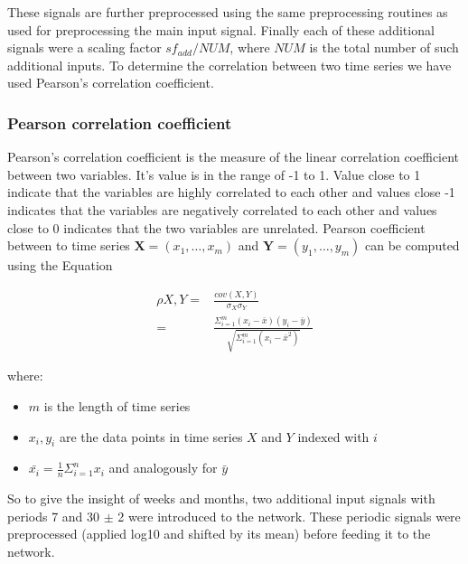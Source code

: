 \begin{enumerate}
\begin{center}
\begin{tabular}{|c|c|c|}
 	\end{tabular}
 	\end{center}
	 
	 
	 These signals are further preprocessed using the same preprocessing routines as used for preprocessing the main input signal. Finally each of these additional signals were a scaling factor $sf_{add}/NUM$, where $NUM$ is the total number of such additional inputs. To determine the correlation between two time series we have used Pearson's correlation coefficient.
	 
 \end{enumerate}
 
 
 
 \subsubsection{Pearson correlation coefficient}
  Pearson's correlation coefficient is the measure of the linear correlation coefficient between two variables. It's value is in the range of -1 to 1. Value close to 1 indicate that the variables are highly correlated to each other and values close -1 indicates that the variables are negatively correlated to each other and values close to 0 indicates that the two variables are unrelated. Pearson coefficient between to time series $\mathbf{X} = (x_1, \hdots, x_m)$ and $\mathbf{Y} = (y_1, \hdots, y_m)$ can be computed using the Equation %
  
  \begin{equation}
  \begin{split}
	  \rho X,Y =& \frac{cov(X,Y)}{\sigma_X \sigma_Y}\\
		=& \frac{\Sigma^{m}_{i=1}(x_i - \bar{x})(y_i - \bar{y})} {\sqrt{\Sigma^m_{i=1}(x_i - \bar{x}^2)}}
  \end{split}
   \label{eq:pearson}
  \end{equation}
  
  where:
  \begin{itemize}
	  \item $m$ is the length of time series
	  \item $x_i, y_i$ are the data points in time series $X$ and $Y$ indexed with $i$
	  \item $\bar{x_i} = \frac{1}{n}\Sigma_{i=1}^{n}x_i$  and analogously for $\bar{y}$
	  
	  \end{itemize}
 
 
 So to give the insight of weeks and months, two additional input signals with periods 7 and 30 $\pm$ 2 were introduced to the network. These periodic signals were preprocessed (applied log10 and shifted by its mean) before feeding it to the network.



